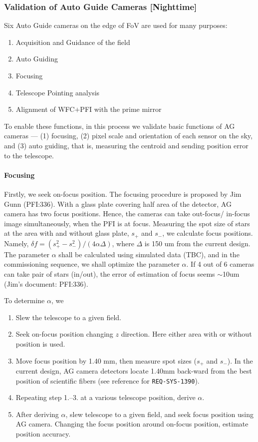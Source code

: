 \subsubsection{Validation of Auto Guide Cameras [Nighttime]}\label{secflow:AGCfunc}

Six Auto Guide cameras on the edge of FoV are used for many purposes:
\begin{enumerate}
\item Acquisition and Guidance of the field 
\item Auto Guiding
\item Focusing
\item Telescope Pointing analysis
\item Alignment of WFC$+$PFI with the prime mirror
\end{enumerate}

To enable these functions, in this process we validate basic functions of AG cameras --- (1) focusing, (2) pixel scale and orientation of each sensor on the sky, and (3) auto guiding, that is, measuring the centroid and sending position error to the telescope.

\paragraph{Focusing}
Firstly, we seek on-focus position.
The focusing procedure is proposed by Jim Gunn (PFI:336).
With a glass plate covering half area of the detector, AG camera has two focus positions.
Hence, the cameras can take out-focus/ in-focus image simultaneously, when the PFI is at focus.
Measuring the spot size of stars at the area with and without glass plate, $s_+$ and $s_-$, we calculate focus positions.
Namely, $\delta f = (s_+^2 - s_-^2)/(4 \alpha \Delta)$, where $\Delta$ is 150 um from the current design.
The parameter $\alpha$ shall be calculated using simulated data (TBC), and in the commissioning sequence, we shall optimize the parameter $\alpha$.
If 4 out of 6 cameras can take pair of stars (in/out), the error of estimation of focus seems $\sim$10um (Jim's document: PFI:336).

To determine $\alpha$, we 
\begin{enumerate}
\item Slew the telescope to a given field.
\item Seek on-focus position changing $z$ direction. 
Here either area with or without position is used.
\item Move focus position by 1.40 mm, then measure spot sizes ($s_+$ and $s_-$).
In the current design, AG camera detectors locate 1.40mm back-ward from the best position of scientific fibers (see reference for {\tt REQ-SYS-1390}).
\item Repeating step 1.--3. at a various telescope position, derive $\alpha$.
\item After deriving $\alpha$, slew telescope to a given field, and seek focus position using AG camera.
Changing the focus position around on-focus position, estimate position accuracy.
\end{enumerate}

